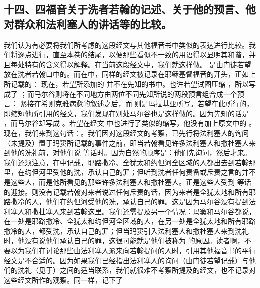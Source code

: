 
\subsection{十四、四福音关于洗者若翰的记述、关于他的预言、他对群众和法利塞人的讲话等的比较。}

我们认为有必要将我们所考虑的这段经文与其他福音书中类似的表达进行比较。我们将逐点进行，直至本卷的结尾，以便那些看似不一致的用语得以显明其和谐，并且每处特有的含义得以解释。在当前这段经文中，我们就这样做。 是由门徒若望放在洗者若翰口中的。而在中，同样的经文被记录在耶稣基督福音的开头，正如上所记载的： 现在，若望所添加的  并不在先知的书中。也许若望试图压缩 ，所以写成了 ；而马尔谷则将在不同地方由两位不同先知所说的两段预言组合成一个预言：  紧接在希则克雅病愈的叙述之后，而  则是玛拉基亚所写。若望在此所行的，即缩短他所引用的经文，我们发现在别处马尔谷也是这样做的。因为先知的话是 ，而马尔谷却写成 。若望在经文  中也进行了类似的缩写，他没有加上原文中的 。现在，我们来到这句话：。我们因对这段经文的考察，已先行将法利塞人的询问（未提及）置于玛窦所记载的事件之前，即当若翰看见许多法利塞人和撒杜塞人来到他的洗礼前，对他们说  等话时。因为自然的顺序是：他们先询问，然后才来。我们还须注意，在中记载，耶路撒冷、全犹太和约但河全区域的人都出去到若翰那里，在约但河里受他的洗，承认自己的罪；但听到洗者任何责备或斥责之言的并不是这些人，而是他所看见的那些许多法利塞人和撒杜塞人。正是这些人受到  等话的迎接。则没有记载若翰对来者说过任何斥责的话，因为来者是全犹太地和所有耶路撒冷的人，他们在约但河受他的洗，承认自己的罪。这是因为马尔谷没有提到法利塞人和撒杜塞人来到若翰这里。我们还需提及另一个情况：玛窦和马尔谷都说，在一处是耶路撒冷、全犹太和约但河全区域的人，在另一处是全犹太地和所有耶路撒冷的人，都受洗，承认自己的罪；但当玛窦引入法利塞人和撒杜塞人来到洗礼时，他没有说他们承认自己的罪，这很可能就是他们被称为  的原因。读者啊，不要以为我们在讨论那些由法利塞人派来向若翰提问的人时，引用其他福音书的平行经文是不合适的。因为如果我们已经指出法利塞人的询问（由门徒若望记载）与他们的洗礼（见于）之间的适当联系，我们就很难不考察所提及的经文，也不记录对这些经文所作的观察。同一样，记下了 